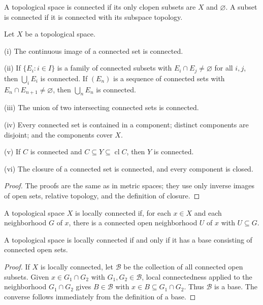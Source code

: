\begin{de}
A topological space is connected if its only clopen subsets are $X$ and
$\varnothing$. A subset is connected if it is connected with its subspace
topology.
\end{de}

\begin{thm}
Let $X$ be a topological space.

(i) The continuous image of a connected set is connected.

(ii) If $\{E_i:i\in I\}$ is a family of connected subsets with
$E_i\cap E_j\neq\varnothing$ for all $i,j$, then $\bigcup_iE_i$ is connected.
If $(E_n)$ is a sequence of connected sets with
$E_n\cap E_{n+1}\neq\varnothing$, then $\bigcup_nE_n$ is connected.

(iii) The union of two intersecting connected sets is connected.

(iv) Every connected set is contained in a component; distinct components
are disjoint; and the components cover $X$.

(v) If $C$ is connected and
$C\subseteq Y\subseteq\operatorname{cl}C$, then $Y$ is connected.

(vi) The closure of a connected set is connected, and every component is
closed.
\end{thm}

\begin{proof}
The proofs are the same as in metric spaces; they use only inverse images of
open sets, relative topology, and the definition of closure.
\end{proof}

\begin{de}
A topological space $X$ is locally connected if, for each $x\in X$ and each
neighborhood $G$ of $x$, there is a connected open neighborhood $U$ of $x$
with $U\subseteq G$.
\end{de}

\begin{thm}
A topological space is locally connected if and only if it has a base
consisting of connected open sets.
\end{thm}

\begin{proof}
If $X$ is locally connected, let $\mathcal{B}$ be the collection of all
connected open subsets. Given $x\in G_1\cap G_2$ with $G_1,G_2\in\mathcal{B}$,
local connectedness applied to the neighborhood $G_1\cap G_2$ gives
$B\in\mathcal{B}$ with $x\in B\subseteq G_1\cap G_2$. Thus $\mathcal{B}$ is
a base. The converse follows immediately from the definition of a base.
\end{proof}

